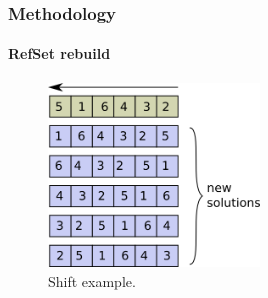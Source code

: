 \begin{frame}
    \frametitle{Methodology}
    \framesubtitle{RefSet rebuild}

        \begin{figure}[h!t]
            \centering
            \includegraphics[width=0.5\textwidth]{../report/img/ia-shift}
            \caption{Shift example.}
            \label{fig:shift}
        \end{figure}

\end{frame}
